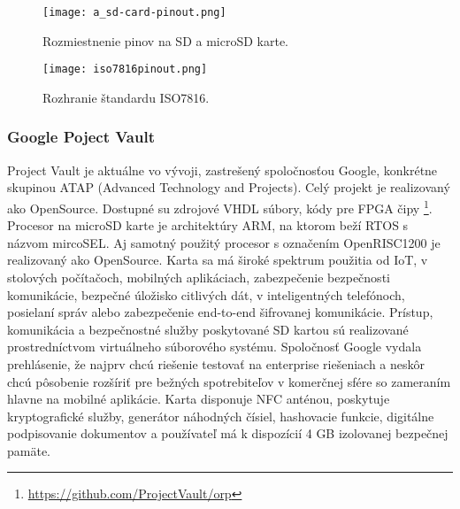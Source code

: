 \documentclass[12pt,a4paper,oneside,openright]{report}
\begin{document}
\begin{figure*}[h]
	\centering
	\texttt{[image: a\_sd-card-pinout.png]}
	\caption{Rozmiestnenie pinov na SD a microSD karte. \cite{usdpinout}}
	\label{f:o_usd}
\end{figure*}

\begin{figure*}[h]
	\centering
	\texttt{[image: iso7816pinout.png]}
	\caption{Rozhranie štandardu ISO7816. \cite{iso7816pinout}}
	\label{f:o_ISO7816}
\end{figure*}


\subsubsection{Google Poject Vault} \label{s_sd_google}
Project Vault je aktuálne vo vývoji, zastrešený spoločnosťou Google, konkrétne skupinou ATAP (Advanced Technology and Projects). Celý projekt je realizovaný ako OpenSource. Dostupné su zdrojové VHDL súbory, kódy pre FPGA čipy \footnote{\url{https://github.com/ProjectVault/orp}}. Procesor na microSD karte je architektúry ARM, na ktorom beží RTOS s názvom mircoSEL. Aj samotný použitý procesor s označením OpenRISC1200 je realizovaný ako OpenSource. Karta sa má široké spektrum použitia od IoT, v stolových počítačoch, mobilných aplikáciach, zabezpečenie bezpečnosti komunikácie, bezpečné úložisko citlivých dát, v inteligentných telefónoch, posielaní správ alebo zabezpečenie end-to-end šifrovanej komunikácie.
Prístup, komunikácia a bezpečnostné služby poskytované SD kartou sú realizované prostredníctvom virtuálneho súborového systému.
Spoločnosť Google vydala prehlásenie, že najprv chcú riešenie testovať na enterprise riešeniach a neskôr chcú pôsobenie rozšíriť pre bežných spotrebiteľov v komerčnej sfére so zameraním hlavne na mobilné aplikácie.
Karta disponuje NFC anténou, poskytuje kryptografické služby, generátor náhodných čísiel, hashovacie funkcie, digitálne podpisovanie dokumentov a používateľ má k dispozícií 4 GB izolovanej bezpečnej pamäte\cite{googlevault}.
\end{document}
